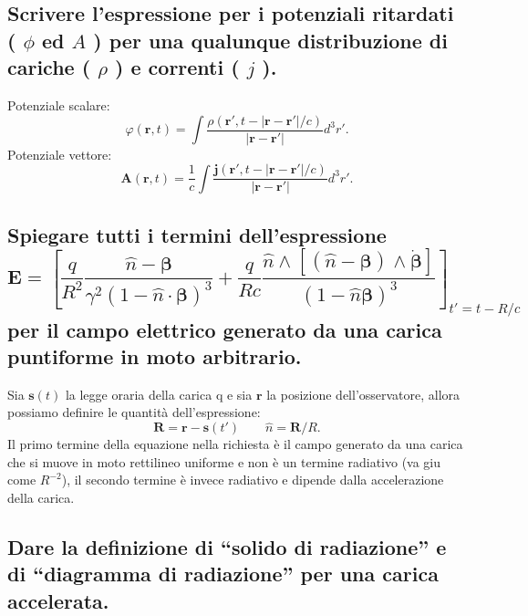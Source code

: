 \subsection[\hspace{1mm} Potenziali ritardati]{Scrivere l’espressione per i potenziali ritardati ( $\phi$ ed $A$ ) per una qualunque distribuzione di cariche ( $\rho$ ) e correnti ( $j$ ).}
\label{sec:3.b.10}
Potenziale scalare:
\[
	\varphi\left( \boldsymbol{r},t \right) = \int 
	\frac{\rho\left( \boldsymbol{r}', t-\left| \boldsymbol{r}-\boldsymbol{r}' \right| /c  \right) }{\left| \boldsymbol{r}-\boldsymbol{r}' \right| } d^3r'
.\] 
Potenziale vettore:
\[
	\boldsymbol{A}\left( \boldsymbol{r},t \right) =\frac{1}{c}\int 
	\frac{\boldsymbol{j}\left( \boldsymbol{r}', t-\left| \boldsymbol{r}-\boldsymbol{r}' \right| /c  \right) }{\left| \boldsymbol{r}-\boldsymbol{r}' \right| }d^3r'
.\] 

\subsection[\hspace{1mm} Campo elettrico generato da una carica puntiforme in moto arbitrario]{Spiegare tutti i termini dell’espressione 
\label{sec:3.a.11}
	\[
	\boldsymbol{E} = \left[ \frac{q}{R^2}\frac{\hat{n}- \boldsymbol{\beta}}{\gamma^2 \left( 1 - \hat{n} \cdot \boldsymbol{\beta} \right)^3 } + \frac{q}{Rc} \frac{\hat{n} \wedge \left[ \left( \hat{n} -\boldsymbol{\beta}  \right) \wedge \dot{\boldsymbol{\beta}} \right] }{\left( 1 - \hat{n} \boldsymbol{\beta}\right)^3 } \right]_{t' = t - R/c}  
\] 
per il campo elettrico generato da una carica puntiforme in moto arbitrario.}
Sia $\boldsymbol{s}\left( t \right) $ la legge oraria della carica q e sia $\boldsymbol{r}$ la posizione dell'osservatore, allora possiamo definire le quantità dell'espressione:
\[
	\boldsymbol{R}=\boldsymbol{r}-\boldsymbol{s}\left( t' \right) \quad \quad \hat{n}=\boldsymbol{R}/R
.\] 
Il primo termine della equazione nella richiesta è il campo generato da una carica che si muove in moto rettilineo uniforme e non è un termine radiativo (va giu come $R^{-2}$), il secondo termine è invece radiativo e dipende dalla accelerazione della carica.
\subsection[\hspace{1mm} Solido di radiazion e diagramma di radiazione]{Dare la definizione di “solido di radiazione” e di “diagramma di radiazione” per una carica accelerata.}
\label{sec:3.a.12}
